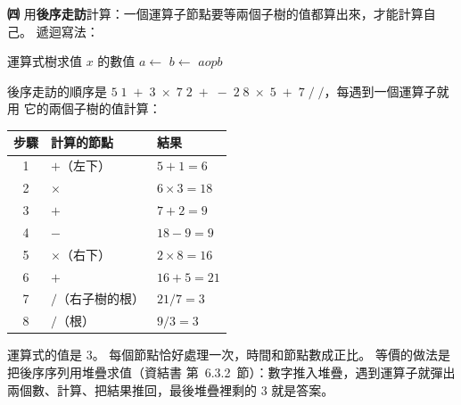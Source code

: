 \begin{pastsoln}
\textbf{㈣} 用\textbf{後序走訪}計算：一個運算子節點要等兩個子樹的值都算出來，才能計算自己。 遞迴寫法：
\begin{pseudo}{運算式樹求值}
        \State \Return $x$ 的數值
    \EndIf
    \State $a \gets$ 
    \State $b \gets$ 
    \State \Return $a \mathbin{\mathit{op}} b$ 
\EndFunction
\end{pseudo}
後序走訪的順序是 $5\;1\;+\;3\;\times\;7\;2\;+\;-\;2\;8\;\times\;5\;+\;7\;/\;/$，每遇到一個運算子就用
它的兩個子樹的值計算：
\begin{center}
\small
\begin{tabular}{cll}
\toprule
步驟 & 計算的節點 & 結果 \\
\midrule
1 & $+$（左下）& $5 + 1 = 6$ \\
2 & $\times$ & $6 \times 3 = 18$ \\
3 & $+$ & $7 + 2 = 9$ \\
4 & $-$ & $18 - 9 = 9$ \\
5 & $\times$（右下）& $2 \times 8 = 16$ \\
6 & $+$ & $16 + 5 = 21$ \\
7 & $/$（右子樹的根）& $21 / 7 = 3$ \\
8 & $/$（根）& $9 / 3 = 3$ \\
\bottomrule
\end{tabular}
\end{center}
運算式的值是 $3$。 每個節點恰好處理一次，時間和節點數成正比。 等價的做法是把後序序列用堆疊求值（資結書
第~6.3.2~節）：數字推入堆疊，遇到運算子就彈出兩個數、計算、把結果推回，最後堆疊裡剩的 $3$ 就是答案。
\end{pastsoln}
